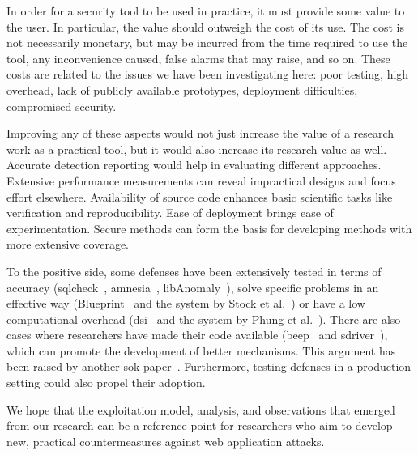 \documentclass[conference]{IEEEtran}
\begin{document}
In order for a security tool to be used in practice, it must provide
some value to the user. In particular, the value should outweigh the
cost of its use. The cost is not necessarily monetary, but may be
incurred from the time required to use the tool, any inconvenience
caused, false alarms that may raise, and so on. These costs are related to the
issues we have been investigating here: poor testing, high overhead,
lack of publicly available prototypes,
deployment difficulties, compromised security. 

Improving any of these aspects would not just increase the value of a 
research work as a practical tool, but it would also increase its
research value as well.
Accurate detection reporting would help in evaluating different
approaches. Extensive performance measurements can reveal impractical
designs and focus effort elsewhere. Availability of source code
enhances basic scientific tasks like verification and reproducibility. Ease of
deployment brings ease of experimentation. Secure methods can form the
basis for developing methods with more extensive coverage.

To the positive side, some defenses have been extensively tested in
terms of accuracy ({\sc sqlc}heck~\cite{SW06},
{\sc amnesia}~\cite{HO06}, libAnomaly~\cite{VMV05}),
solve specific problems in an effective way
(Blueprint~\cite{LV09} and the system by Stock et al.~\cite{SLMS14}) or
have a low computational overhead
({\sc dsi}~\cite{NSS06} and the system by Phung et al.~\cite{PSC09}).
There are also cases where
researchers have made their code available ({\sc beep}~\cite{TNH07}
and {\sc sd}river~\cite{MS09}),
which can promote the development of better
mechanisms. This argument has been raised by another {\sc s}o{\sc k}
paper~\cite{SPWS13}. Furthermore, testing defenses in a production
setting could also propel their adoption.

We hope that the exploitation model, analysis, and observations that
emerged from our research can be a reference point for researchers who
aim to develop new, practical countermeasures against web application
attacks.


\end{document}
